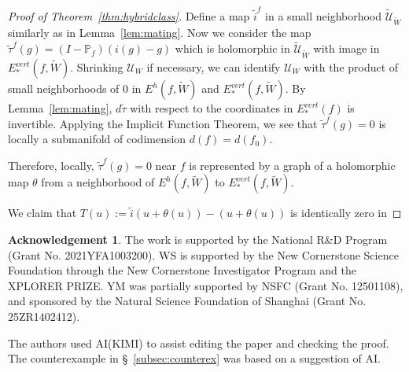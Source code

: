 \documentclass{amsart}
\numberwithin{equation}{section}
\theoremstyle{definition}
\newtheorem*{acknowledgement}{Acknowledgement}
\theoremstyle{remark}
\begin{document}
\begin{proof}[Proof of Theorem~\ref{thm:hybridclass}]
Define a map $\widetilde{i}^f$ in a small neighborhood $\widetilde{\mathcal{U}}_{\widetilde{W}}$ similarly as in Lemma~\ref{lem:mating}. 
Now we consider the map $\widetilde{\tau}^f(g)=(I-\mathbb{P}_f)(i(g)-g)$ which is holomorphic in $\widetilde{\mathcal{U}}_{\widetilde{W}}$ with image in $E^{vert}_*(f, \widetilde{W})$. Shrinking $\mathcal{U}_W$ if necessary, we can identify $\mathcal{U}_W$ with the product of small neighborhoods of $0$ in $E^h(f,\widetilde{W})$ and $E^{vert}_*(f,\widetilde{W})$. By Lemma~\ref{lem:mating},  $d\widetilde{\tau}$ with respect to the coordinates in $E^{vert}_*(f)$ is invertible. Applying the Implicit Function Theorem, we see that $\widetilde{\tau}^f(g)=0$ is locally a submanifold of codimension $d(f)=d(f_0)$. 

Therefore, locally, $\widetilde{\tau}^f(g)=0$ near $f$ is represented by a graph of a holomorphic map $\theta$ from a neighborhood of $E^h(f,\widetilde{W})$ to $E^{vert}_*(f,\widetilde{W})$. 

We claim that $T(u):=\widetilde{i}(u+\theta(u))-(u+\theta(u))$ is identically zero in 

\end{proof}
\fi

\begin{acknowledgement}
The work is supported by the National R\&D Program (Grant No. 2021YFA1003200). WS is supported by the New Cornerstone Science Foundation through the New Cornerstone Investigator Program and the XPLORER PRIZE.
YM was partially supported by NSFC (Grant No. 12501108), and
sponsored by the Natural Science Foundation of Shanghai (Grant No. 25ZR1402412).


The authors used AI(KIMI) to assist editing the paper and checking the proof. The counterexample in \S~\ref{subsec:counterex} was based on a suggestion of AI. 
\end{acknowledgement}
\end{document}
